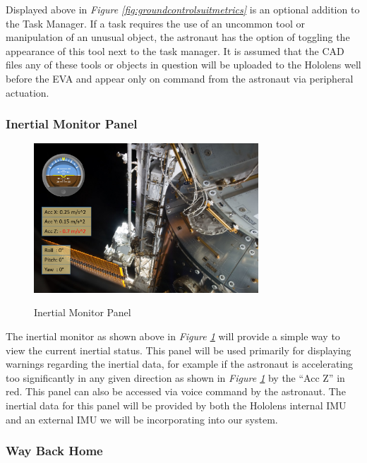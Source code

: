 \documentclass{article}
\let\Oldsubsubsection\subsubsection
\renewcommand{\subsubsection}{\FloatBarrier\Oldsubsubsection}
\begin{document}
Displayed above in \textit{Figure \ref{fig:groundcontrolsuitmetrics}} is an optional addition to the Task Manager. If a task requires the use of an uncommon tool or manipulation of an unusual object, the astronaut has the option of toggling the appearance of this tool next to the task manager. It is assumed that the CAD files any of these tools or objects in question will be uploaded to the Hololens well before the EVA and appear only on command from the astronaut via peripheral actuation.

\subsubsection{Inertial Monitor Panel}

\begin{figure}[!htb]
  \centering
  \caption{Inertial Monitor Panel}
  \includegraphics[width=0.75\textwidth]{assets/suitmetrics.png}
  \label{fig:suitmetrics}
\end{figure}

The inertial monitor as shown above in \textit{Figure \ref{fig:suitmetrics}} will provide a simple way to view the current inertial status. This panel will be used primarily for displaying warnings regarding the inertial data, for example if the astronaut is accelerating too significantly in any given direction as shown in \textit{Figure \ref{fig:suitmetrics}} by the “Acc Z” in red.  This panel can also be accessed via voice command by the astronaut. The inertial data for this panel will be provided by both the Hololens internal IMU and an external IMU we will be incorporating into our system.

\subsubsection{Way Back Home}
\end{document}
